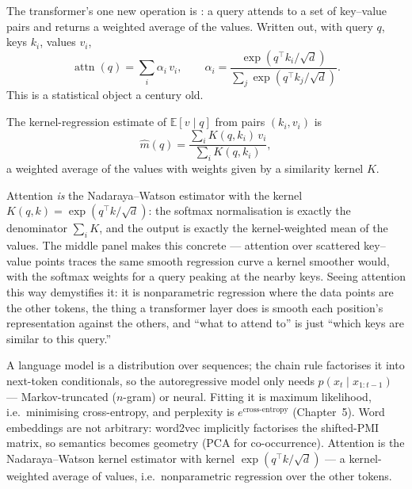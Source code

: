 \documentclass[11pt]{article}
\begin{document}
The transformer's one new operation is : a query attends to a
set of key--value pairs and returns a weighted average of the values. Written out,
with query $q$, keys $k_i$, values $v_i$,
\[
  \operatorname{attn}(q) = \sum_i \alpha_i\, v_i,
  \qquad \alpha_i = \frac{\exp(q^\top k_i/\sqrt d)}{\sum_j \exp(q^\top k_j/\sqrt d)} .
\]
This is a statistical object a century old.

\begin{definition}
The kernel-regression estimate of $\mathbb{E}[v\mid q]$ from pairs $(k_i,v_i)$ is
\[
  \hat m(q) = \frac{\sum_i K(q,k_i)\,v_i}{\sum_i K(q,k_i)},
\]
a weighted average of the values with weights given by a similarity kernel $K$.
\end{definition}

Attention \emph{is} the Nadaraya--Watson estimator with the kernel
$K(q,k)=\exp(q^\top k/\sqrt d)$: the softmax normalisation is exactly the
denominator $\sum_i K$, and the output is exactly the kernel-weighted mean of the
values. The middle panel makes this concrete --- attention over scattered
key--value points traces the same smooth regression curve a kernel smoother
would, with the softmax weights for a query peaking at the nearby keys. Seeing
attention this way demystifies it: it is nonparametric regression where the data
points are the other tokens, the thing a transformer layer does is smooth each
position's representation against the others, and ``what to attend to'' is just
``which keys are similar to this query.''

\begin{summarybox}
A language model is a distribution over sequences; the chain rule factorises it
into next-token conditionals, so the autoregressive model only needs
$p(x_t\mid x_{1:t-1})$ --- Markov-truncated ($n$-gram) or neural. Fitting it is
maximum likelihood, i.e.\ minimising cross-entropy, and perplexity is
$e^{\text{cross-entropy}}$ (Chapter~5). Word embeddings are not arbitrary:
word2vec implicitly factorises the shifted-PMI matrix, so semantics becomes
geometry (PCA for co-occurrence). Attention is the Nadaraya--Watson kernel
estimator with kernel $\exp(q^\top k/\sqrt d)$ --- a kernel-weighted average of
values, i.e.\ nonparametric regression over the other tokens.
\end{summarybox}
\end{document}
